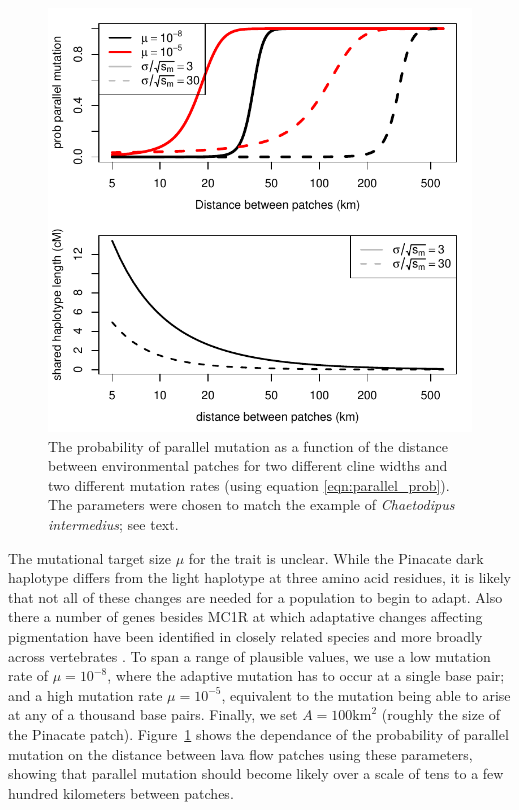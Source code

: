 \documentclass{article}
\begin{document}
\begin{figure}[ht]
  \begin{center}
    \includegraphics{Lava_flow_mice_prob_parallel}
  \end{center}
  \caption{
The probability of parallel mutation as a function of the distance
between environmental patches for two different cline widths
and two different mutation rates (using equation \eqref{eqn:parallel_prob}). 
The parameters were chosen to match the example of \textit{Chaetodipus intermedius};
see text.
  \label{fig:mice_prob_parallel}
  }
\end{figure}

The mutational target size $\mu$ for the trait is unclear. 
While the Pinacate dark haplotype differs from the light haplotype at three amino acid residues,
it is likely that not all of these changes are needed for a population to begin to adapt. 
Also there a number of genes besides MC1R at which adaptative changes affecting pigmentation 
have been identified in closely related species and more broadly across vertebrates \citep{Hoekstra:06}.
To span a range of plausible values, we use a low mutation rate of $\mu= 10^{-8}$, 
where the adaptive mutation has to occur at a single base pair; 
and a high mutation rate $\mu= 10^{-5}$, equivalent to the mutation
being able to arise at any of a thousand base pairs.  
Finally, we set $A=100\text{km}^2$ (roughly the size of the Pinacate patch).
Figure~\ref{fig:mice_prob_parallel} shows the dependance of the probability
of parallel mutation on the distance between lava flow patches using these parameters, 
showing that parallel mutation should become
likely over a scale of tens to a few hundred kilometers between patches. 
\end{document}
